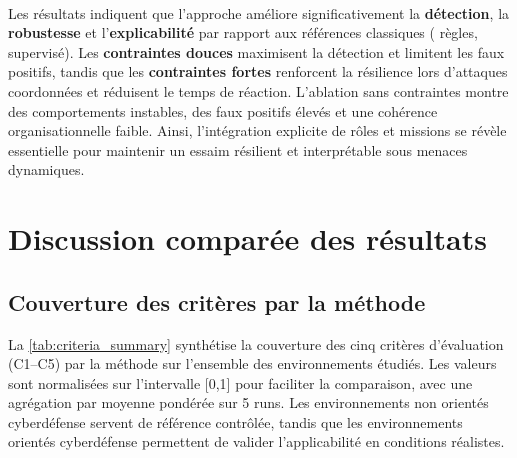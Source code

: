 \

Les résultats indiquent que l’approche  améliore significativement la \textbf{détection}, la \textbf{robustesse} et l’\textbf{explicabilité} par rapport aux références classiques ( règles,  supervisé).
Les \textbf{contraintes douces} maximisent la détection et limitent les faux positifs, tandis que les \textbf{contraintes fortes} renforcent la résilience lors d’attaques coordonnées et réduisent le temps de réaction.
L’ablation sans contraintes montre des comportements instables, des faux positifs élevés et une cohérence organisationnelle faible.
Ainsi, l’intégration explicite de rôles et missions se révèle essentielle pour maintenir un essaim résilient et interprétable sous menaces dynamiques.


\section{Discussion comparée des résultats}

\subsection{Couverture des critères par la méthode}

La \autoref{tab:criteria_summary} synthétise la couverture des cinq critères d’évaluation (C1--C5) par la méthode  sur l’ensemble des environnements étudiés.
Les valeurs sont normalisées sur l’intervalle [0,1] pour faciliter la comparaison, avec une agrégation par moyenne pondérée sur 5 runs.
Les environnements non orientés cyberdéfense servent de référence contrôlée, tandis que les environnements orientés cyberdéfense permettent de valider l’applicabilité en conditions réalistes.

